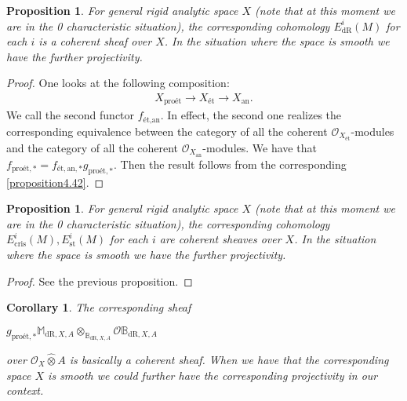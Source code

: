 \documentclass[12pt]{amsart}
\newtheorem{proposition}[theorem]{Proposition}
\newtheorem{corollary}[theorem]{Corollary}
\theoremstyle{definition}
\numberwithin{equation}{section}
\begin{document}
\begin{proposition} \label{proposition4.45}
For general rigid analytic space $X$ (note that at this moment we are in the 0 characteristic situation), the corresponding cohomology $E^i_\mathrm{dR}(M)$ for each $i$ is a coherent sheaf over $X$. In the situation where the space is smooth we have the further projectivity.	
\end{proposition}
	

\begin{proof}
One looks at the following composition:
\begin{align}
X_{\text{pro\'et}}\rightarrow X_{\text{\'et}} \rightarrow X_\mathrm{an}.	
\end{align}
We call the second functor $f_{\text{\'et},\text{an}}$. In effect, the second one realizes the corresponding equivalence between the category of all the coherent $\mathcal{O}_{X_{\text{\'et}}}$-modules and the category of all the coherent $\mathcal{O}_{X_{\text{an}}}$-modules. We have that $f_{\text{pro\'et},*}=f_{\text{\'et},\text{an},*}g_{\text{pro\'et},*}$. Then the result follows from the corresponding \cref{proposition4.42}.
\end{proof}


\begin{proposition} 
For general rigid analytic space $X$ (note that at this moment we are in the 0 characteristic situation), the corresponding cohomology $E^i_\mathrm{cris}(M),E^i_\mathrm{st}(M)$ for each $i$ are coherent sheaves over $X$. In the situation where the space is smooth we have the further projectivity.	
\end{proposition}


\begin{proof}
See the previous proposition.	
\end{proof}






\begin{corollary}
The corresponding sheaf
\begin{center}
 $g_{\text{pro\'et},*} \mathbb{M}_{\mathrm{dR},X,A}\otimes_{\mathbb{B}_{\mathrm{dR},X,A}}	 \mathcal{O}\mathbb{B}_{\mathrm{dR},X,A}$
\end{center}
over $\mathcal{O}_X\widehat{\otimes}A$ is basically a coherent sheaf.	When we have that the corresponding space $X$ is smooth we could further have the corresponding projectivity in our context. 
\end{corollary}
 
\end{document}
